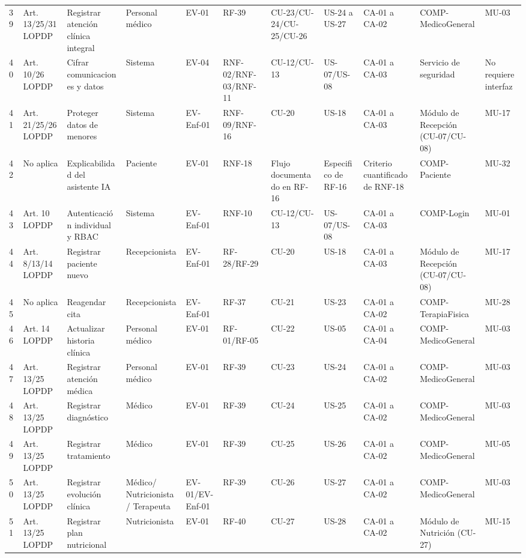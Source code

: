 \documentclass[11pt,a4paper]{article}
\begin{document}
\begin{longtable}{p{} p{} p{} p{} p{} p{} p{} p{} p{} p{} p{}}
		39 & Art. 13/25/31 LOPDP & Registrar atención clínica integral & Personal médico & EV-01 & RF-39 & CU-23/CU-24/CU-25/CU-26 & US-24 a US-27 & CA-01 a CA-02 & COMP-MedicoGeneral & MU-03 \\
		40 & Art. 10/26 LOPDP & Cifrar comunicaciones y datos & Sistema & EV-04 & RNF-02/RNF-03/RNF-11 & CU-12/CU-13 & US-07/US-08 & CA-01 a CA-03 & Servicio de seguridad & No requiere interfaz \\
		41 & Art. 21/25/26 LOPDP & Proteger datos de menores & Sistema & EV-Enf-01 & RNF-09/RNF-16 & CU-20 & US-18 & CA-01 a CA-03 & Módulo de Recepción (CU-07/CU-08) & MU-17 \\
		42 & No aplica & Explicabilidad del asistente IA & Paciente & EV-01 & RNF-18 & Flujo documentado en RF-16 & Especifico 
		de RF-16 & Criterio cuantificado de RNF-18 & COMP-Paciente & MU-32 \\
		43 & Art. 10 LOPDP & Autenticación individual y RBAC & Sistema & EV-Enf-01 & RNF-10 & CU-12/CU-13 & US-07/US-08 & CA-01 a CA-03 & COMP-Login & MU-01 \\
		44 & Art. 8/13/14 LOPDP & Registrar paciente nuevo & Recepcionista & EV-Enf-01 & RF-28/RF-29 & CU-20 & US-18 & CA-01 a CA-03 & Módulo de Recepción (CU-07/CU-08) & MU-17 \\
		45 & No aplica & Reagendar cita & Recepcionista & EV-Enf-01 & RF-37 & CU-21 & US-23 & CA-01 a CA-02 & COMP-TerapiaFisica & MU-28 \\
		46 & Art. 14 LOPDP & Actualizar historia clínica & Personal médico & EV-01 & RF-01/RF-05 & CU-22 & US-05 & CA-01 a CA-04 & COMP-MedicoGeneral & MU-03 \\
		47 & Art. 13/25 LOPDP & Registrar atención médica & Personal médico & EV-01 & RF-39 & CU-23 & US-24 & CA-01 a CA-02 & COMP-MedicoGeneral & MU-03 \\
		48 & Art. 13/25 LOPDP & Registrar diagnóstico & Médico & EV-01 & RF-39 & CU-24 & US-25 & CA-01 a CA-02 & COMP-MedicoGeneral & MU-03 \\
		49 & Art. 13/25 LOPDP & Registrar tratamiento & Médico & EV-01 & RF-39 & CU-25 & US-26 & CA-01 a CA-02 & COMP-MedicoGeneral & MU-05 \\
		50 & Art. 13/25 LOPDP & Registrar evolución clínica & Médico/
		Nutricionista/
		Terapeuta & EV-01/EV-Enf-01 & RF-39 & CU-26 & US-27 & CA-01 a CA-02 & COMP-MedicoGeneral & MU-03 \\
		51 & Art. 13/25 LOPDP & Registrar plan nutricional & Nutricionista & EV-01 & RF-40 & CU-27 & US-28 & CA-01 a CA-02 & Módulo de Nutrición (CU-27) & MU-15 \\

\end{longtable}
\end{document}
